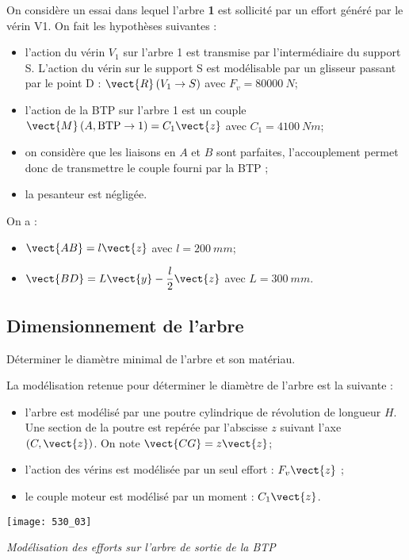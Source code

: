  

On considère un essai dans lequel l’arbre \textbf{1} est sollicité par un effort généré par le vérin V1. On fait les hypothèses suivantes :
\begin{itemize}
\item l’action du vérin $V_1$ sur l’arbre 1 est transmise par l’intermédiaire du support S. L’action du vérin sur le support S est modélisable par un glisseur passant par le point D : $\vect{R}\left( V_1\to S\right)$ avec $F_v=\SI{80 000}{N}$;
\item l’action de la BTP sur l’arbre 1 est un couple $\vect{M}\left(A,\text{BTP}\to 1 \right)=C_1 \vect{z}$ avec $C_1=\SI{4 100}{Nm}$;
\item on considère que les liaisons en $A$ et $B$ sont parfaites, l’accouplement permet donc de transmettre le couple fourni par la BTP ;
\item la pesanteur est négligée.
\end{itemize}
On a :
\begin{itemize}
\item $\vect{AB}=l\vect{z}$ avec $l=\SI{200}{mm}$;
\item $\vect{BD}=L\vect{y}-\dfrac{l}{2}\vect{z}$ avec $L=\SI{300}{mm}$.
\end{itemize}

\fi

\subsection*{Dimensionnement de l’arbre}
\begin{obj}	Déterminer le diamètre minimal de l’arbre et son matériau.
\end{obj}

La modélisation retenue pour déterminer le diamètre de l’arbre est la suivante  :
\begin{itemize}
\item l’arbre est modélisé par une poutre cylindrique de révolution de longueur $H$. Une section de la poutre est repérée par l’abscisse $z$ suivant l’axe $(C,\vect{z})$. On note $\vect{CG}=z\vect{z}$;
\item l’action des vérins est modélisée par un seul effort : $F_v \vect{z}$ ;
\item le couple moteur est modélisé par un moment : $C_1\vect{z}$.
\end{itemize} 

\begin{center}
\texttt{[image: 530\_03]}

\textit{Modélisation des efforts sur l’arbre de sortie de la BTP}
\end{center}

